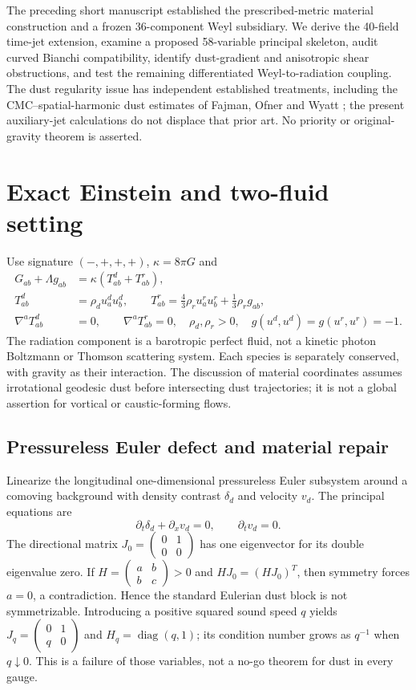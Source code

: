 \documentclass[11pt,a4paper]{article}
\newcommand{\kap}{\kappa}
\begin{document}
The preceding short manuscript established the prescribed-metric material construction and a frozen 36-component Weyl subsidiary. We derive the 40-field time-jet extension, examine a proposed 58-variable principal skeleton, audit curved Bianchi compatibility, identify dust-gradient and anisotropic shear obstructions, and test the remaining differentiated Weyl-to-radiation coupling. The dust regularity issue has independent established treatments, including the CMC--spatial-harmonic dust estimates of Fajman, Ofner and Wyatt \cite{FOW}; the present auxiliary-jet calculations do not displace that prior art. No priority or original-gravity theorem is asserted.

\section{Exact Einstein and two-fluid setting}
Use signature $(-,+,+,+)$, $\kap=8\pi G$ and
\begin{align}
G_{ab}+\Lambda g_{ab}&=\kap(T^d_{ab}+T^r_{ab}),\label{eq:einstein}\\
T^d_{ab}&=\rho_d u^d_a u^d_b,\qquad
T^r_{ab}=\tfrac43\rho_r u^r_a u^r_b+\tfrac13\rho_r g_{ab},\label{eq:stress}\\
\nabla^aT^d_{ab}&=0,\qquad\nabla^aT^r_{ab}=0,\quad
\rho_d,\rho_r>0,\quad g(u^d,u^d)=g(u^r,u^r)=-1.\nonumber
\end{align}
The radiation component is a barotropic perfect fluid, not a kinetic photon Boltzmann or Thomson scattering system. Each species is separately conserved, with gravity as their interaction. The discussion of material coordinates assumes irrotational geodesic dust before intersecting dust trajectories; it is not a global assertion for vortical or caustic-forming flows.

\subsection{Pressureless Euler defect and material repair}
Linearize the longitudinal one-dimensional pressureless Euler subsystem around a comoving background with density contrast $\delta_d$ and velocity $v_d$. The principal equations are
\[\partial_t\delta_d+\partial_xv_d=0,\qquad\partial_tv_d=0.\]
The directional matrix $J_0=\left(\begin{smallmatrix}0&1\\0&0\end{smallmatrix}\right)$ has one eigenvector for its double eigenvalue zero. If $H=\left(\begin{smallmatrix}a&b\\b&c\end{smallmatrix}\right)>0$ and $HJ_0=(HJ_0)^T$, then symmetry forces $a=0$, a contradiction. Hence the standard Eulerian dust block is not symmetrizable. Introducing a positive squared sound speed $q$ yields $J_q=\left(\begin{smallmatrix}0&1\\q&0\end{smallmatrix}\right)$ and $H_q=\operatorname{diag}(q,1)$; its condition number grows as $q^{-1}$ when $q\downarrow0$. This is a failure of those variables, not a no-go theorem for dust in every gauge.
\end{document}
